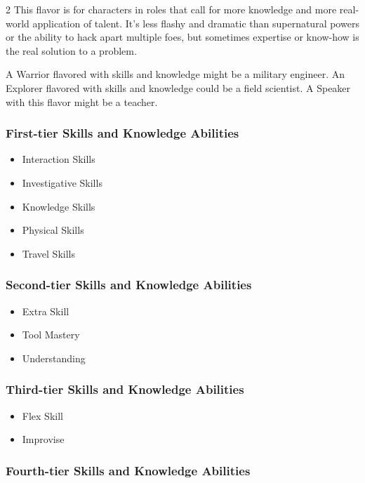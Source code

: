 \begin{multicols}{2}
This flavor is for characters in roles that call for more knowledge and more real-world application of talent. It’s less flashy and dramatic than supernatural powers or the ability to hack apart multiple foes, but sometimes expertise or
know-how is the real solution to a problem.

A Warrior flavored with skills and knowledge might be a military engineer. An Explorer flavored with skills and knowledge could be a field scientist. A Speaker with this flavor might be a teacher.

\subsubsection{First-tier Skills and Knowledge Abilities}

\begin{itemize}
\item Interaction Skills
\item Investigative Skills 
\item Knowledge Skills
\item Physical Skills
\item Travel Skills
\end{itemize}

\subsubsection{Second-tier Skills and Knowledge Abilities}

\begin{itemize}
\item Extra Skill
\item Tool Mastery
\item Understanding
\end{itemize}

\subsubsection{Third-tier Skills and Knowledge Abilities}

\begin{itemize}
\item Flex Skill
\item Improvise
\end{itemize}

\subsubsection{Fourth-tier Skills and Knowledge Abilities}


\end{multicols}
